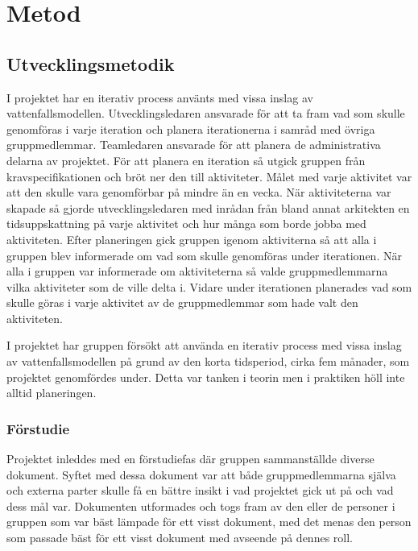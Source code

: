 \chapter{Metod}
\label{cha:method}

\section{Utvecklingsmetodik}

I projektet har en iterativ process använts med vissa inslag av vattenfallsmodellen. Utvecklingsledaren ansvarade för att ta fram vad som skulle genomföras i varje iteration och planera iterationerna i samråd med övriga gruppmedlemmar. Teamledaren ansvarade för att planera de administrativa delarna av projektet. För att planera en iteration så utgick gruppen från kravspecifikationen och bröt ner den till aktiviteter. Målet med varje aktivitet var att den skulle vara genomförbar på mindre än en vecka. När aktiviteterna var skapade så gjorde utvecklingsledaren med inrådan från bland annat arkitekten en tidsuppskattning på varje aktivitet och hur många som borde jobba med aktiviteten. Efter planeringen gick gruppen igenom aktiviterna så att alla i gruppen blev informerade om vad som skulle genomföras under iterationen. När alla i gruppen var informerade om aktiviteterna så valde gruppmedlemmarna vilka aktiviteter som de ville delta i. Vidare under iterationen planerades vad som skulle göras i varje aktivitet av de gruppmedlemmar som hade valt den aktiviteten.

I projektet har gruppen försökt att använda en iterativ process med vissa inslag av vattenfallsmodellen på grund av den korta tidsperiod, cirka fem månader, som projektet genomfördes under.
Detta var tanken i teorin men i praktiken höll inte alltid planeringen.

\subsection{Förstudie}

Projektet inleddes med en förstudiefas där gruppen sammanställde diverse dokument. Syftet med dessa dokument var att både gruppmedlemmarna själva och externa parter skulle få en bättre insikt i vad projektet gick ut på och vad dess mål var. Dokumenten utformades och togs fram av den eller de personer i gruppen som var bäst lämpade för ett visst dokument, med det menas den person som passade bäst för ett visst dokument med avseende på dennes roll.

